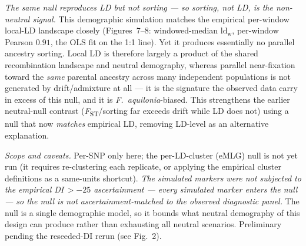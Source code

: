 \documentclass[11pt]{article}
\newcommand{\Faq}{\textit{F.~aquilonia}}
\begin{document}
{%
\emph{The same null reproduces LD but not sorting --- so sorting, not LD, is the non-neutral
signal.} This demographic simulation matches the empirical per-window local-LD landscape closely
(Figures~7--8: windowed-median $\mathrm{ld_w}$, per-window Pearson $0.91$, the OLS fit on the 1:1
line). Yet it produces essentially no parallel
ancestry sorting. Local LD is therefore largely a product of the shared recombination landscape
and neutral demography, whereas parallel near-fixation toward the \emph{same} parental ancestry
across many independent populations is not generated by drift/admixture at all --- it is the
signature the observed data carry in excess of this null, and it is \Faq{}-biased. This
strengthens the earlier neutral-null contrast (\emph{F}\textsubscript{ST}/sorting far exceeds
drift while LD does not) using a null that now \emph{matches} empirical LD, removing LD-level as an
alternative explanation.

\emph{Scope and caveats.} Per-SNP only here; the per-LD-cluster (eMLG) null is not yet run
(it requires re-clustering each replicate, or applying the empirical cluster definitions as a
same-units shortcut). \emph{The simulated markers were not subjected to the empirical DI\,$>-25$
ascertainment --- every simulated marker enters the null --- so the null is not
ascertainment-matched to the observed diagnostic panel.} The null is a single demographic model,
so it bounds what neutral demography of this design can produce rather than exhausting all neutral
scenarios. Preliminary pending the reseeded-DI rerun (see Fig.~2).}
\end{document}
